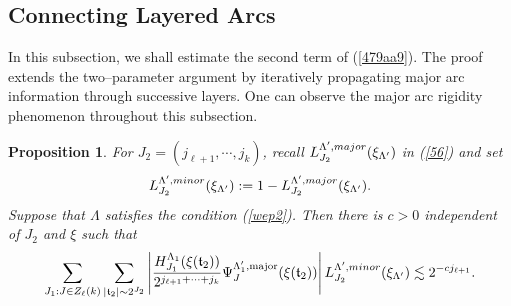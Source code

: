 \documentclass[10pt,a4paper]{amsart}
\newtheorem{proposition}{Proposition}\numberwithin{proposition}{section}
\numberwithin{equation}{section}
\begin{document}
 
 
  
 \subsection{Connecting Layered Arcs}\label{sec5.2}
In this subsection, we shall estimate the second term of (\ref{479aa9}). 
The proof extends the two--parameter argument by iteratively propagating major arc information through successive layers. One can observe the major arc rigidity phenomenon  throughout this subsection. 

\begin{proposition}\label{prop5167b9}
For  $J_2=(j_{\ell+1},\cdots,j_k)$, recall $ L^{\Lambda',\rm{major}}_{J_2}(\xi_{\Lambda'})$ in (\ref{56}) and set
 $$ L^{\Lambda',\rm{minor}}_{J_2}(\xi_{\Lambda'}):= 1- L^{\Lambda',\rm{major}}_{J_2}(\xi_{\Lambda'}).$$  Suppose that $\Lambda$ satisfies   the  condition (\ref{wep2}).  Then
there is $c>0$  independent of $J_2$ and $\xi$ such that
\begin{align} 
\label{44gg9} \sum_{J_1:J\in Z_\ell(k)}\sum_{|\mathfrak{t}_{2}|\sim 2^{J_2}} \left| \frac{ H^{\Lambda_{1}}_{J_1}( \xi(\mathfrak{t}_2)) }{2^{j_{\ell+1}+\cdots+j_k}}
\Psi_{J}^{\Lambda'_1,\mathrm{major}}( \xi(\mathfrak{t}_2)) \right|L^{\Lambda',\rm{minor}}_{J_2}(\xi_{\Lambda'})\lesssim
 2^{-cj_{\ell+1}}.
\end{align} 
\end{proposition}
\end{document}
